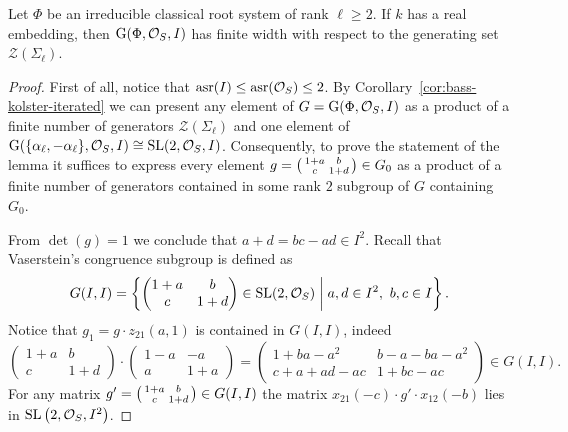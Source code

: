 \begin{lemma}\label{lemma:width-dedekind}
Let $\Phi$ be an irreducible classical root system of rank $\ell \geqslant 2$.
If $k$ has a real embedding, then $\operatorname{G}(\Phi,\mathcal{O}_S,I)$ has finite width with respect to the generating set $\mathcal{Z}(\Sigma_\ell)$.
\end{lemma}
\begin{proof}
First of all, notice that $\operatorname{asr}(I) \leq \operatorname{asr}(\mathcal{O}_S) \leq 2$. 
By Corollary~\ref{cor:bass-kolster-iterated} we can present any element 
of $G=\operatorname{G}(\Phi, \mathcal{O}_S, I)$ as a product of a finite number of generators $\mathcal{Z}(\Sigma_\ell)$ and one element of 
$\operatorname{G}(\{\alpha_\ell, -\alpha_\ell\}, \mathcal{O}_S, I)\cong\operatorname{SL}(2,\mathcal{O}_S,I)$.
Consequently, to prove the statement of the lemma it suffices to express every element 
$g = \begin{psmallmatrix}1+a & b \\ c & 1+d \end{psmallmatrix} \in G_0$
as a product of a finite number of generators contained in some rank $2$ subgroup of $G$ containing $G_0$.

From $\det(g)=1$ we conclude that $a+d=bc-ad\in I^2$. 
Recall that Vaserstein's congruence subgroup is defined as
\[ G(I,I)=\left\{ \begin{pmatrix}1+a & b \\ c & 1+d\end{pmatrix}\in\SL(2,\mathcal{O}_S)\;\middle|\; a,d\in I^2,\ b,c\in I \right\}. \]
Notice that $g_1=g\cdot z_{21}(a,1)$ is contained in $G(I,I)$, indeed
\[ \begin{pmatrix} 1+a & b \\ c & 1+d \end{pmatrix} \cdot \begin{pmatrix} 1-a & -a \\ a & 1+a \end{pmatrix} = \begin{pmatrix} 1+ba-a^2 & b-a-ba-a^2 \\ c+a+ad-ac & 1+bc-ac \end{pmatrix} \in G(I,I). \]
For any matrix $g'=\begin{psmallmatrix}1+a & b \\ c & 1+d\end{psmallmatrix}\in G(I,I)$ the matrix $x_{21}(-c)\cdot g'\cdot x_{12}(-b)$ lies in $\operatorname{SL}\left(2,\mathcal{O}_S,I^2\right)$.


\end{proof}
